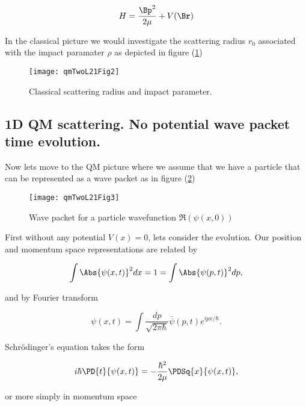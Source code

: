 \begin{equation}\label{eqn:qmTwoL21:n}
H = \frac{\Bp^2}{2 \mu} + V(\Br)
\end{equation}

In the classical picture we would investigate the scattering radius $r_0$ associated with the impact paramater $\rho$ as depicted in figure (\ref{fig:qmTwoL21:qmTwoL21Fig2})

\begin{figure}[htp]
   \centering
   \texttt{[image: qmTwoL21Fig2]}
   \caption{Classical scattering radius and impact parameter.}\label{fig:qmTwoL21:qmTwoL21Fig2}
\end{figure}

\subsection{1D QM scattering.  No potential wave packet time evolution.}

Now lets move to the QM picture where we assume that we have a particle that can be represented as a wave packet as in figure (\ref{fig:qmTwoL21:qmTwoL21Fig3})
\begin{figure}[htp]
   \centering
   \texttt{[image: qmTwoL21Fig3]}
   \caption{Wave packet for a particle wavefunction $\Re(\psi(x,0))$}\label{fig:qmTwoL21:qmTwoL21Fig3}
\end{figure}

First without any potential $V(x) = 0$, lets consider the evolution.  Our position and momentum space representations are related by

\begin{equation}\label{eqn:qmTwoL21:n}
\int \Abs{\psi(x, t)}^2 dx = 1 = \int \Abs{\psi(p, t)}^2 dp,
\end{equation}

and by Fourier transform

\begin{equation}\label{eqn:qmTwoL21:n}
\psi(x, t) = \int \frac{dp}{\sqrt{2 \pi \hbar}} \bar{\psi}(p, t) e^{i p x/\hbar}.
\end{equation}

Schr\"{o}dinger's equation takes the form

\begin{equation}\label{eqn:qmTwoL21:n}
i \hbar \PD{t}{\psi(x,t)} = - \frac{\hbar^2}{2 \mu} \PDSq{x}{\psi(x, t)},
\end{equation}

or more simply in momentum space

